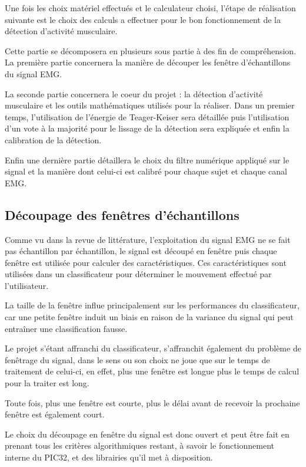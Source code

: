 \documentclass[letterpaper, twoside, 12pt, memoire, creativecommons, hyperref]{thETS}
\begin{document}
Une fois les choix matériel effectués et le calculateur choisi, l'étape de réalisation suivante est le choix des calculs a effectuer pour le bon fonctionnement de la détection d'activité musculaire. 

Cette partie se décomposera en plusieurs sous partie à des fin de compréhension. La première partie concernera la manière de découper les fenêtre d'échantillons du signal EMG. 

La seconde partie concernera le coeur du projet : la détection d'activité musculaire et les outils mathématiques utilisés pour la réaliser. Dans un premier temps, l'utilisation de l'énergie de Teager-Keiser sera détaillée puis l'utilisation d'un vote à la majorité pour le lissage de la détection sera expliquée et enfin la calibration de la détection.

Enfin une dernière partie détaillera le choix du filtre numérique appliqué sur le signal et la manière dont celui-ci est calibré pour chaque sujet et chaque canal EMG.

\subsection{Découpage des fenêtres d'échantillons}

Comme vu dans la revue de littérature, l'exploitation du signal EMG ne se fait pas échantillon par échantillon, le signal est découpé en fenêtre puis chaque fenêtre est utilisée pour calculer des caractéristiques. Ces caractéristiques sont utilisées dans un classificateur pour déterminer le mouvement effectué par l'utilisateur. 

La taille de la fenêtre influe principalement sur les performances du classificateur, car une petite fenêtre induit un biais en raison de la variance du signal qui peut entraîner une classification fausse. 

Le projet s'étant affranchi du classificateur, s'affranchit également du problème de fenêtrage du signal, dans le sens ou son choix ne joue que sur le temps de traitement de celui-ci, en effet, plus une fenêtre est longue plus le temps de calcul pour la traiter est long. 

Toute fois, plus une fenêtre est courte, plus le délai avant de recevoir la prochaine fenêtre est également court. 

Le choix du découpage en fenêtre du signal est donc ouvert et peut être fait en prenant tous les critères algorithmiques restant, à savoir le fonctionnement interne du PIC32, et des librairies qu'il met à disposition. 
\end{document}
